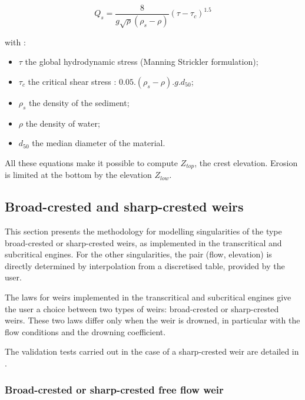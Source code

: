 \begin{equation}
 Q_s = \frac{8}{g \sqrt{\rho}(\rho_s - \rho)}(\tau - \tau_c)^{1.5}
\end{equation}

with :
\begin{itemize}
 \item $\tau$ the global hydrodynamic stress (Manning Strickler formulation);
 \item $\tau_c$ the critical shear stress : $0.05 . (\rho_s - \rho).g.d_{50}$;
 \item $\rho_s$ the density of the sediment;
 \item $\rho$ the density of water;
 \item $d_{50}$ the median diameter of the material.
\end{itemize}

All these equations make it possible to compute $Z_{top}$, the crest elevation. Erosion is limited at the bottom by the elevation $Z_{low}$.

\subsection{Broad-crested and sharp-crested weirs}
\label{LoiSeuilMinceEpais}

This section presents the methodology for modelling singularities of the type broad-crested or sharp-crested weirs, as implemented in the transcritical and subcritical engines. For the other singularities, the pair (flow, elevation) is directly determined by interpolation from a discretised table, provided by the user.

The laws for weirs implemented in the transcritical and subcritical engines give the user a choice between two types of weirs: broad-crested or sharp-crested weirs. These two laws differ only when the weir is drowned, in particular with the flow conditions and the drowning coefficient.

The validation tests carried out in the case of a sharp-crested weir are detailed in \cite{GOUTAL03}.

\subsubsection{Broad-crested or sharp-crested free flow weir}

